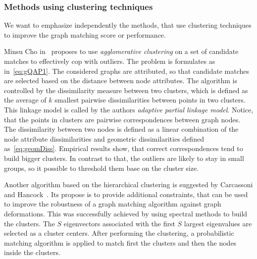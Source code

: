 \subsubsection{Methods using clustering techniques}
We want to emphasize independently the methods, that use clustering techniques to improve the graph matching score or performance.

Minsu Cho in~\cite{Cho2009_AgglClustering} proposes to use \emph{agglomerative clustering} on a set of candidate matches to effectively cop with outliers. The problem is formulates as in~\eqref{eq:gQAP1}. The considered graphs are attributed, so that candidate matches are selected based on the distance between node attributes. The algorithm is controlled by the dissimilarity measure between two clusters, which is defined as the average of $k$ smallest pairwise dissimilarities between points in two clusters. This linkage model is called by the authors \emph{adaptive partial linkage model}. Notice, that the points in clusters are pairwise correspondences between graph nodes. The dissimilarity between two nodes is defined as a linear combination of the node attribute dissimilarities and 
geometric dissimilarities defined as~\eqref{eq:geomDiss}. Empirical results show, that correct correspondences tend to build bigger clusters. In contrast to that, the outliers are likely to stay in small groups, so it possible to threshold them base on the cluster size.

Another algorithm based on the hierarchical clustering is suggested by Carcassoni and Hancock~\cite{Hancock_ModalClusters}. Its propose is to provide additional constraints, that can be used to improve the robustness of a graph matching algorithm against graph deformations. This was successfully achieved by using spectral methods to build the clusters. The $S$ eigenvectors associated with the first $S$ largest eigenvalues are selected as a cluster centers. After performing the clustering, a probabilistic matching algorithm is applied to match first the clusters and then the nodes inside the clusters.

